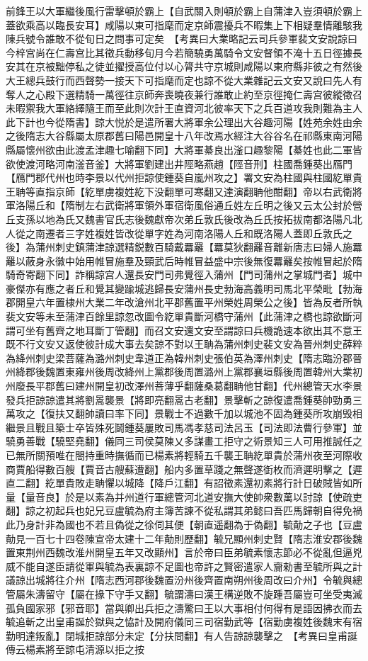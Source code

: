 前鋒王以大軍繼後風行雷擊頓於霸上【自武關入則頓於霸上自蒲津入豈須頓於霸上蓋欲乘高以臨長安耳】咸陽以東可指麾而定京師震擾兵不暇集上下相疑羣情離駭我陳兵號令誰敢不從旬日之問事可定矣　【考異曰大業略記云司兵參軍裴文安說諒曰今梓宫尚在仁壽宫比其徵兵動移旬月今若簡驍勇萬騎令文安督領不淹十五日徑據長安其在京被黜停私之徒並擢授高位付以心膂共守京城則咸陽以東府縣非彼之有然後大王總兵鼓行而西聲勢一接天下可指麾而定也諒不從大業雜記云文安又說曰先人有奪人之心殿下選精騎一萬徑往京師奔喪曉夜兼行誰敢止約至京徑掩仁壽宫彼縱徵召未暇禦我大軍絡繹隨王而至此則次計王直資河北彼率天下之兵百道攻我則難為主人此下計也今從隋書】諒大悦於是遣所署大將軍余公理出大谷趣河陽【姓苑余姓由余之後隋志大谷縣屬太原郡舊曰陽邑開皇十八年改焉水經注大谷谷名在祁縣東南河陽縣屬懷州欲由此渡孟津趣七喻翻下同】大將軍綦良出滏口趣黎陽【綦姓也此二軍皆欲使渡河略河南滏音釜】大將軍劉建出井陘略燕趙【陘音刑】柱國喬鍾葵出鴈門【鴈門郡代州也時李景以代州拒諒使鍾葵自嵐州攻之】署文安為柱國與柱國紇單貴王聃等直指京師【紇單虜複姓紇下没翻單可寒翻又達演翻聃他酣翻】帝以右武衛將軍洛陽丘和【隋制左右武衛將軍領外軍宿衛風俗通丘姓左丘明之後又云太公封於營丘支孫以地為氏又魏書官氏志後魏獻帝次弟丘敦氏後改為丘氏按拓拔南都洛陽凡北人從之南遷者三字姓複姓皆改從單字姓為河南洛陽人丘和既洛陽人蓋即丘敦氏之後】為蒲州刺史鎮蒲津諒選精鋭數百騎戴羃䍦【羃莫狄翻䍦音離新唐志曰婦人施羃䍦以蔽身永徽中始用帷冒施羣及頸武后時帷冒益盛中宗後無復羃䍦矣按帷冒起於隋騎奇寄翻下同】詐稱諒宫人還長安門司弗覺徑入蒲州【門司蒲州之掌城門者】城中豪傑亦有應之者丘和覺其變踰城逃歸長安蒲州長史勃海高義明司馬北平榮毗【勃海郡開皇六年置棣州大業二年改滄州北平郡舊置平州榮姓周榮公之後】皆為反者所執裴文安等未至蒲津百餘里諒忽改圖令紇單貴斷河橋守蒲州【此蒲津之橋也諒欲斷河謂可坐有舊齊之地耳斷丁管翻】而召文安還文安至謂諒曰兵機詭速本欲出其不意王既不行文安又返使彼計成大事去矣諒不對以王聃為蒲州刺史裴文安為晉州刺史薛粹為絳州刺史梁菩薩為潞州刺史韋道正為韓州刺史張伯英為澤州刺史【隋志臨汾郡晉州絳郡後魏置東雍州後周改絳州上黨郡後周置潞州上黨郡襄垣縣後周置韓州大業初州廢長平郡舊曰建州開皇初改澤州菩薄乎翻薩桑葛翻聃他甘翻】代州總管天水李景發兵拒諒諒遣其將劉暠襲景【將即亮翻暠古老翻】景擊斬之諒復遣喬鍾葵帥勁勇三萬攻之【復扶又翻帥讀曰率下同】景戰士不過數千加以城池不固為鍾葵所攻崩毁相繼景且戰且築士卒皆殊死鬬鍾葵屢敗司馬馮孝慈司法呂玉【司法即法曹行參軍】並驍勇善戰【驍堅堯翻】儀同三司侯莫陳乂多謀畫工拒守之術景知三人可用推誠任之已無所關預唯在閤持重時撫循而已楊素將輕騎五千襲王聃紇單貴於蒲州夜至河際收商賈船得數百艘【賈音古艘蘇遭翻】船内多置草踐之無聲遂衘枚而濟遲明擊之【遲直二翻】紇單貴敗走聃懼以城降【降戶江翻】有詔徵素還初素將行計日破賊皆如所量【量音良】於是以素為并州道行軍總管河北道安撫大使帥衆數萬以討諒【使疏吏翻】諒之初起兵也妃兄豆盧毓為府主簿苦諫不從私謂其弟懿曰吾匹馬歸朝自得免禍此乃身計非為國也不若且偽從之徐伺其便【朝直遥翻為于偽翻】毓勣之子也【豆盧勣見一百七十四卷陳宣帝太建十二年勣則歷翻】毓兄顯州刺史賢【隋志淮安郡後魏置東荆州西魏改淮州開皇五年又改顯州】言於帝曰臣弟毓素懷志節必不從亂但逼兇威不能自遂臣請從軍與毓為表裏諒不足圖也帝許之賢密遣家人齎勑書至毓所與之計議諒出城將往介州【隋志西河郡後魏置汾州後齊置南朔州後周改曰介州】令毓與總管屬朱濤留守【屬在掾下守手又翻】毓謂濤曰漢王構逆敗不旋踵吾屬豈可坐受夷滅孤負國家邪【邪音耶】當與卿出兵拒之濤驚曰王以大事相付何得有是語因拂衣而去毓追斬之出皇甫誕於獄與之恊計及開府儀同三司宿勤武等【宿勤虜複姓後魏末有宿勤明達叛亂】閉城拒諒部分未定【分扶問翻】有人告諒諒襲擊之　【考異曰皇甫誕傳云楊素將至諒屯清源以拒之按
